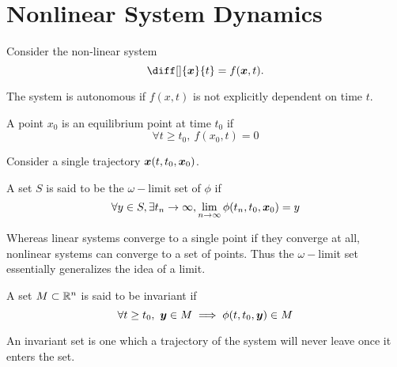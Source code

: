 \section{Nonlinear System Dynamics}
Consider the non-linear system \[
	\diff[]{\bs{x}}{t} = f(\bs{x}, t).
\]
\begin{definition}
	The system is autonomous if $f(x, t)$ is not explicitly dependent on time $t$.
	\label{defn:autonomous-system}
\end{definition}
\begin{definition}
	A point $x_0$ is an equilibrium point at time $t_0$ if \[
		\forall t \geq t_0, \ f(x_0, t) = 0 
	\]
	\label{defn:equilibrium-point}
\end{definition}
Consider a single trajectory $\boldsymbol{x}(t, t_0, \boldsymbol{x}_0)$.
\begin{definition}
	A set $S$ is said to be the $\omega-$limit set of $\phi$ if\[
		\forall y\in S,\exists t_n\to \infty, \lim_{n\to\infty}\phi(t_n, t_0,
		\boldsymbol{x}_0) = y
	\]
	\label{defn:w-limit-set}
\end{definition}
Whereas linear systems converge to a single point if they converge at all,
nonlinear systems can converge to a set of points. Thus the $\omega-$limit set
essentially generalizes the idea of a limit.
\begin{definition}
	A set $M\subset \mathbb{R}^n$ is said to be invariant if \[
		\forall t\geq t_0,\ \boldsymbol{y}\in M \implies \phi(t, t_0, \boldsymbol{y}) \in M
	\]
	\label{defn:invariant-set}
\end{definition}
An invariant set is one which a trajectory of the system will never leave once it enters the
set.
